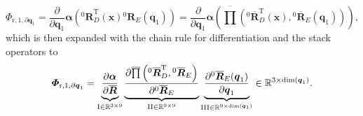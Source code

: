 \documentclass[robotics,article,accept,moreauthors,pdftex]{Definitions/mdpi}
\newcommand{\bm}[1]{\boldsymbol{#1}}
\newcommand{\rotmat}[2]{{{ }^{#1}\boldsymbol{R}}_{#2}}
\newcommand{\rotmato}[2]{{{ }^{#1}\boldsymbol{\overline{R}}}_{#2}}
\newcommand{\transp}[0]{{\mathrm{T}}}
\let\Phi\varPhi
\begin{document}
\begin{equation}
\bm{\Phi}_{\mathrm{r},1,\partial\bm{q}_1}
=
\frac{\partial}{\partial \bm{q}_1} \bm{\alpha}\left(\rotmat{0}{D}^\transp(\bm{x}) \rotmat{0}{E}(\bm{q}_1)\right)
=
\frac{\partial}{\partial \bm{q}_1} \bm{\alpha}\left(\overline{\prod}\left( \rotmato{0}{D}^\transp(\bm{x}), \rotmato{0}{E}(\bm{q}_1)\right)\right), \label{equ:grad_Phi_1_q_part1}
\end{equation}
%
which is then expanded with the chain rule for differentiation and the stack operators to
%
\begin{equation}
\bm{\Phi}_{\mathrm{r},1,\partial\bm{q}_1}
=
\underbrace{
	\vphantom{\frac{\partial \overline{\prod}\left(\rotmato{0}{D}^\transp, \rotmato{0}{E}\right)}{\partial \rotmato{0}{E}}}
	\frac{\partial \bm{\alpha}}{\partial \overline{\bm{R}}}
	}_{\mathrm{I} \in {\mathbb{R}}^{3 \times 9}}
\underbrace{
	\frac{\partial \overline{\prod}\left(\rotmato{0}{D}^\transp, \rotmato{0}{E}\right)}{\partial \rotmato{0}{E}}
	}_{\mathrm{II} \in {\mathbb{R}}^{9 \times 9}}
\underbrace{
	\vphantom{\frac{\partial \overline{\prod}\left(\rotmato{0}{D}^\transp, \rotmato{0}{E}\right)}{\partial \rotmato{0}{E}}}
	\frac{\partial \rotmato{0}{E}(\bm{q}_1)}{\partial \bm{q}_1}
	}_{\mathrm{III} \in {\mathbb{R}}^{9 \times \mathrm{dim}(\bm{q}_1)}}
\in {\mathbb{R}}^{3 \times \mathrm{dim}(\bm{q}_1)}.
\label{equ:grad_Phi_1_q}
\end{equation}
%
\end{document}
